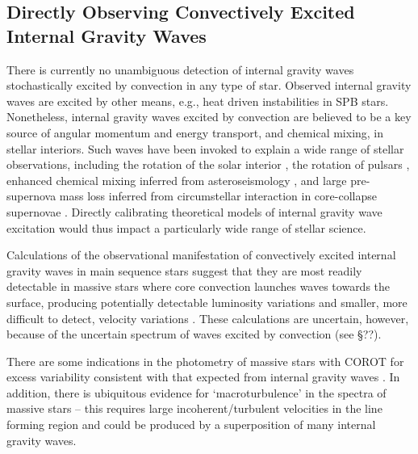 {\color{blue}
\subsection{Directly Observing Convectively Excited Internal Gravity Waves}}

There is currently no unambiguous detection of  internal gravity waves stochastically excited by convection in any type of star.  Observed internal gravity waves  are excited by other means, e.g., heat driven instabilities in SPB stars. Nonetheless, internal gravity waves excited by convection are believed to be a key source of angular momentum and energy transport, and chemical mixing, in stellar interiors.   Such waves have been invoked to explain a wide range of stellar observations, including the rotation of the solar interior \citep{Kumar_1999}, the rotation of pulsars \citep{fullerwave:15}, enhanced chemical mixing inferred from asteroseismology \citep{moravveji:15}, and large pre-supernova mass loss inferred from circumstellar interaction in core-collapse supernovae \citep{quataert:12}.   Directly calibrating theoretical models of internal gravity wave excitation would thus impact a particularly wide range of stellar science.

Calculations of the observational manifestation of convectively excited internal gravity waves in main sequence stars suggest that they are most readily detectable in massive stars where core convection launches waves towards the surface, producing potentially detectable luminosity variations and smaller, more difficult to detect, velocity variations \citep{samadi2010,shiode2013}.   These calculations are uncertain, however, because of the uncertain spectrum of waves excited by convection (see \S ??).   

There are some indications in the photometry of massive stars with COROT for excess variability consistent with that expected from internal gravity waves \citep{Aerts2015}.   In addition, there is ubiquitous evidence for `macroturbulence' in the spectra of massive stars -- this requires large incoherent/turbulent velocities in the line forming region and could be produced by a superposition of many internal gravity waves.

